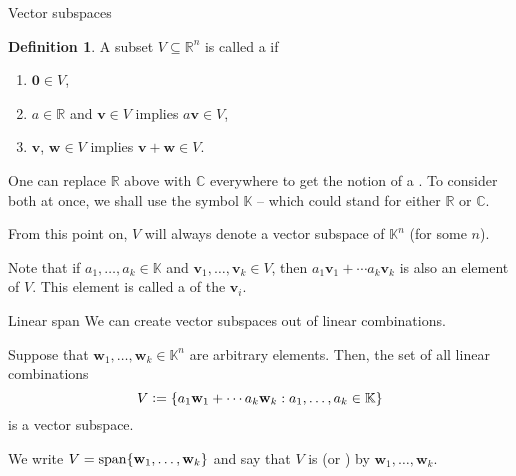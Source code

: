 \documentclass[dvipsnames]{beamer}
\theoremstyle{definition}
\newtheorem{defn}[thm]{Definition}
\let\subset\subseteq
\begin{document}
\begin{frame}{Vector subspaces}
    \begin{defn}
        A subset $V \subset \mathbb{R}^{n}$ is called a  if
        \begin{enumerate}[<+->]
            \item $\mathbf{0} \in V$,
            \item $a \in \mathbb{R}$ and $\mathbf{v} \in V$ implies $a \mathbf{v} \in V$,
            \item $\mathbf{v}$, $\mathbf{w} \in V$ implies $\mathbf{v} + \mathbf{w} \in V$.
        \end{enumerate}
    \end{defn} \pause

    One can replace $\mathbb{R}$ above with $\mathbb{C}$ everywhere to get the notion of a . \pause To consider both at once, we shall use the symbol $\mathbb{K}$ -- which could stand for either $\mathbb{R}$ or $\mathbb{C}$. \pause

    From this point on, $V$ will always denote a vector subspace of $\mathbb{K}^{n}$ (for some $n$). \pause

    Note that if $a_{1}, \ldots, a_{k} \in \mathbb{K}$ and $\mathbf{v}_{1}, \ldots, \mathbf{v}_{k} \in V$, then $a_{1} \mathbf{v}_{1} + \cdots a_{k} \mathbf{v}_{k}$ is also an element of $V$. \pause This element is called a  of the $\mathbf{v}_{i}$.
\end{frame}
\begin{frame}{Linear span}
    We can create vector subspaces out of linear combinations. \pause

    Suppose that $\mathbf{w}_{1}, \ldots, \mathbf{w}_{k} \in \mathbb{K}^{n}$ are arbitrary elements. \pause Then, the set of all linear combinations
    \begin{equation*} 
        V \vcentcolon= \{a_{1} \mathbf{w}_{1} + \cdots a_{k} \mathbf{w}_{k} : a_{1}, \ldots, a_{k} \in \mathbb{K}\}
    \end{equation*}
    is a vector subspace. \pause 

    We write $V = \operatorname{span}\{\mathbf{w}_{1}, \ldots, \mathbf{w}_{k}\}$ and say that $V$ is  (or ) by $\mathbf{w}_{1}, \ldots, \mathbf{w}_{k}$.
\end{frame}
\end{document}
